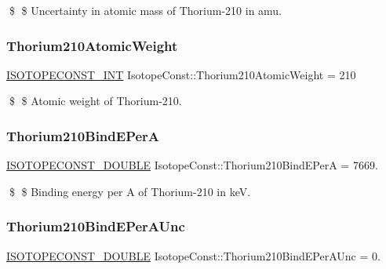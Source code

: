 \$ \$ Uncertainty in atomic mass of Thorium-\/210 in amu. \mbox{\label{group___isotope_const-_thorium-_th210_gaf7e0c0e246ba534c78aa5792c250424a}} 
\subsubsection{\texorpdfstring{Thorium210\+Atomic\+Weight}{Thorium210AtomicWeight}}
{\footnotesize\ttfamily \mbox{\hyperlink{group___isotope_const-_macros_ga5f18360b3e99483a35c32d789e62621c}{I\+S\+O\+T\+O\+P\+E\+C\+O\+N\+S\+T\+\_\+\+I\+NT}} Isotope\+Const\+::\+Thorium210\+Atomic\+Weight = 210}

\$ \$ Atomic weight of Thorium-\/210. \mbox{\label{group___isotope_const-_thorium-_th210_ga70619ca1ee505d236ff29e4b45ec0b06}} 
\subsubsection{\texorpdfstring{Thorium210\+Bind\+E\+PerA}{Thorium210BindEPerA}}
{\footnotesize\ttfamily \mbox{\hyperlink{group___isotope_const-_macros_ga8f45a7272ce02c0b4c65c44636ed719a}{I\+S\+O\+T\+O\+P\+E\+C\+O\+N\+S\+T\+\_\+\+D\+O\+U\+B\+LE}} Isotope\+Const\+::\+Thorium210\+Bind\+E\+PerA = 7669.}

\$ \$ Binding energy per A of Thorium-\/210 in keV. \mbox{\label{group___isotope_const-_thorium-_th210_ga21667302180b79dae1119976cea5fdf5}} 
\subsubsection{\texorpdfstring{Thorium210\+Bind\+E\+Per\+A\+Unc}{Thorium210BindEPerAUnc}}
{\footnotesize\ttfamily \mbox{\hyperlink{group___isotope_const-_macros_ga8f45a7272ce02c0b4c65c44636ed719a}{I\+S\+O\+T\+O\+P\+E\+C\+O\+N\+S\+T\+\_\+\+D\+O\+U\+B\+LE}} Isotope\+Const\+::\+Thorium210\+Bind\+E\+Per\+A\+Unc = 0.}

